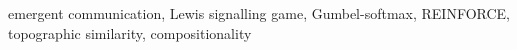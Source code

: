 emergent communication, Lewis signalling game, Gumbel-softmax, REINFORCE, topographic similarity, compositionality
